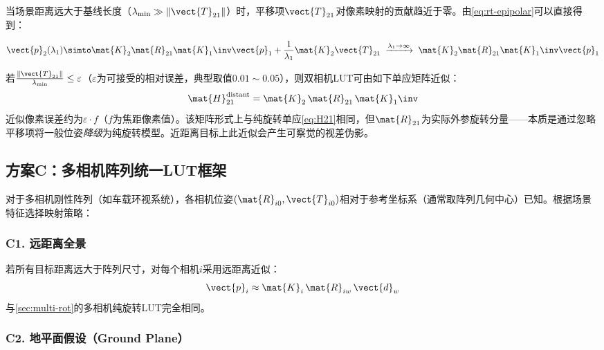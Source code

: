 当场景距离远大于基线长度（$\lambda_{\min} \gg \|\vect{T}_{21}\|$）时，平移项$\vect{T}_{21}$对像素映射的贡献趋近于零。由\eqref{eq:rt-epipolar}可以直接得到：

\begin{equation}
\vect{p}_2(\lambda_1) \simto
\mat{K}_2\mat{R}_{21}\mat{K}_1\inv\vect{p}_1 + \frac{1}{\lambda_1}\mat{K}_2\vect{T}_{21}
\;\xrightarrow{\lambda_1 \to \infty}\;
\mat{K}_2\mat{R}_{21}\mat{K}_1\inv\vect{p}_1
\end{equation}

\begin{proposition}[远距离近似条件及其LUT]
若$\frac{\|\vect{T}_{21}\|}{\lambda_{\min}} \le \varepsilon$（$\varepsilon$为可接受的相对误差，典型取值$0.01 \sim 0.05$），则双相机LUT可由如下单应矩阵近似：
\begin{equation}
\mat{H}_{21}^{\text{distant}} = \mat{K}_2\,\mat{R}_{21}\,\mat{K}_1\inv
\label{eq:distant-approx}
\end{equation}
近似像素误差约为$\varepsilon \cdot f$（$f$为焦距像素值）。该矩阵形式上与纯旋转单应\cref{eq:H21}相同，但$\mat{R}_{21}$为实际外参旋转分量——本质是通过忽略平移项将一般位姿\emph{降级}为纯旋转模型。近距离目标上此近似会产生可察觉的视差伪影。
\end{proposition}

\subsection{方案C：多相机阵列统一LUT框架}
\label{sec:rt-multi}

对于多相机刚性阵列（如车载环视系统），各相机位姿$(\mat{R}_{i0}, \vect{T}_{i0})$相对于参考坐标系（通常取阵列几何中心）已知。根据场景特征选择映射策略：

\subsubsection{C1. 远距离全景}

若所有目标距离远大于阵列尺寸，对每个相机$i$采用远距离近似：
\begin{equation}
\vect{p}_i \approx \mat{K}_i\,\mat{R}_{iw}\,\vect{d}_w
\label{eq:multi-distant}
\end{equation}
与\cref{sec:multi-rot}的多相机纯旋转LUT完全相同。

\subsubsection{C2. 地平面假设（Ground Plane）}

